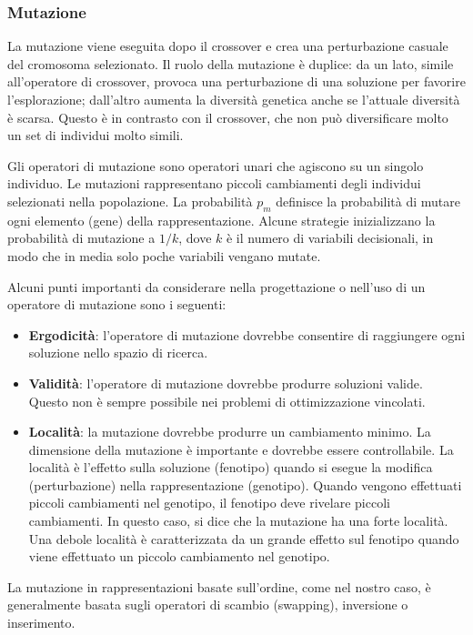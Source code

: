 \subsubsection{Mutazione}
La mutazione viene eseguita dopo il crossover e crea una perturbazione casuale del cromosoma selezionato. Il ruolo della mutazione è duplice: da un lato, simile all'operatore di crossover, provoca una perturbazione di una soluzione per favorire l'esplorazione; dall'altro aumenta la diversità genetica anche se l'attuale diversità è scarsa. Questo è in contrasto con il crossover, che non può diversificare molto un set di individui molto simili.

Gli operatori di mutazione sono operatori unari che agiscono su un singolo individuo. Le mutazioni rappresentano piccoli cambiamenti degli individui selezionati nella popolazione. La probabilità $p_m$ definisce la probabilità di mutare ogni elemento (gene) della rappresentazione. Alcune strategie inizializzano la probabilità di mutazione a $1/k$, dove $k$ è il numero di variabili decisionali, in modo che in media solo poche variabili vengano mutate.

Alcuni punti importanti da considerare nella progettazione o nell'uso di un operatore di mutazione sono i seguenti:

\begin{itemize}
    \item \textbf{Ergodicità}: l'operatore di mutazione dovrebbe consentire di raggiungere ogni soluzione nello spazio di ricerca.
    \item \textbf{Validità}: l'operatore di mutazione dovrebbe produrre soluzioni valide. Questo non è sempre possibile nei problemi di ottimizzazione vincolati.
    \item \textbf{Località}: la mutazione dovrebbe produrre un cambiamento minimo. La dimensione della mutazione è importante e dovrebbe essere controllabile. La località è l'effetto sulla soluzione (fenotipo) quando si esegue la modifica (perturbazione) nella rappresentazione (genotipo). Quando vengono effettuati piccoli cambiamenti nel genotipo, il fenotipo deve rivelare piccoli cambiamenti. In questo caso, si dice che la mutazione ha una forte località. Una debole località è caratterizzata da un grande effetto sul fenotipo quando viene effettuato un piccolo cambiamento nel genotipo.
\end{itemize}

La mutazione in rappresentazioni basate sull'ordine, come nel nostro caso, è generalmente basata sugli operatori di scambio (swapping), inversione o inserimento. 


